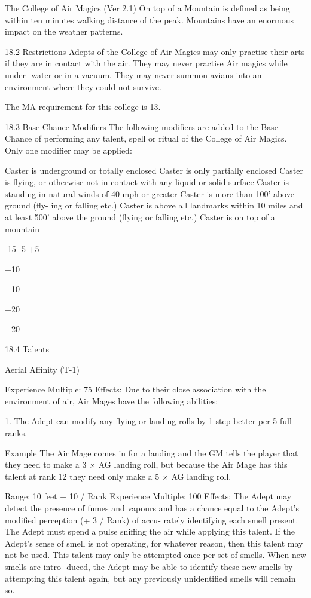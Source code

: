\begin{Chapter}{The College of Air Magics (Ver 2.1)}
On top of a Mountain is defined as being within ten 
minutes  walking  distance  of  the  peak.  Mountains 
have an enormous impact on the weather patterns. 

18.2 Restrictions 
Adepts  of  the  College  of  Air  Magics  may  only 
practise their arts if they are in contact with the air. 
They  may  never  practise  Air  magics  while  under-
water  or  in  a  vacuum.  They  may  never  summon 
avians  into  an  environment  where  they  could  not 
survive. 

The MA requirement for this college is 13. 

18.3 Base Chance Modifiers 
The  following  modifiers  are  added  to  the  Base 
Chance  of  performing  any  talent,  spell  or  ritual  of 
the College of Air Magics. Only one modifier may 
be applied: 

Caster is underground or totally enclosed 
Caster is only partially enclosed 
Caster is flying, or otherwise not in contact 
with any liquid or solid surface 
Caster is standing in natural winds of 40 mph 
or greater 
Caster is more than 100’ above ground (fly-
ing or falling etc.) 
Caster is above all landmarks within 10 miles 
and at least 500’ above the ground (flying or 
falling etc.) 
Caster is on top of a mountain 

-15 
-5 
+5 

+10 

+10 

+20 

+20 

18.4 Talents 

Aerial Affinity (T-1) 

Experience Multiple: 75 
Effects:  Due  to  their  close  association  with  the 
environment  of  air,  Air  Mages  have  the  following 
abilities: 

1.  The  Adept  can  modify  any  flying  or  landing 
rolls by 1 step better per 5 full ranks. 

Example 
The  Air  Mage  comes  in  for  a  landing  and 
the  GM  tells  the  player  that  they  need  to  make  a  3  ×  AG 
landing  roll,  but  because  the  Air  Mage  has  this  talent  at 
rank 12 they need only make a 5 × AG landing roll. 

Range: 10 feet + 10 / Rank 
Experience Multiple: 100 
Effects:  The  Adept  may  detect  the  presence  of 
fumes  and  vapours  and  has  a  chance  equal  to  the 
Adept’s modified perception (+ 3 / Rank) of accu-
rately  identifying  each  smell  present.  The  Adept 
must  spend a pulse  sniffing the  air  while  applying 
this  talent.  If  the  Adept’s  sense  of  smell  is  not 
operating, for whatever reason, then this talent may 
not  be  used.  This  talent  may  only  be  attempted 
once per set of smells. When new smells are intro-
duced, the Adept may be able to identify these new 
smells  by  attempting  this  talent  again,  but  any 
previously unidentified smells will remain so. 


\end{Chapter}
